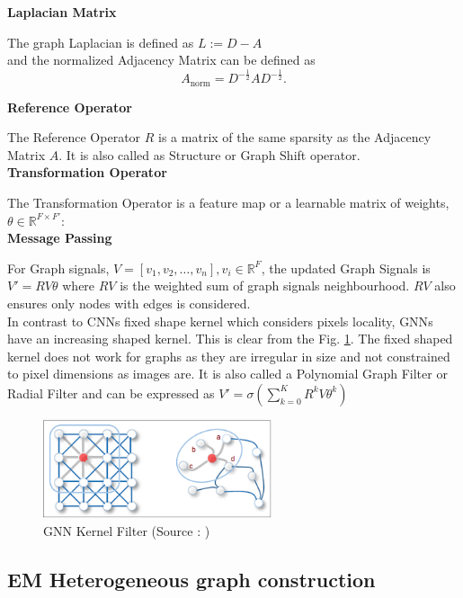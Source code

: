 \documentclass{report} %
\begin{document}
\textbf{Laplacian Matrix}

The graph Laplacian is defined as \( L := D - A \) \\ and the normalized Adjacency Matrix can be defined as
\[
A_{\text{norm}} = D^{-\frac{1}{2}} A D^{-\frac{1}{2}}.
\]

\textbf{Reference Operator}

The Reference Operator \( R \) is a matrix of the same sparsity as the Adjacency Matrix \( A \). It is also called as Structure or Graph Shift operator.\\

\textbf{Transformation Operator}

The Transformation Operator is a feature map or a learnable matrix of weights, \( \theta \in \mathbb{R}^{F \times F'} \):\\

\textbf{Message Passing}

For Graph signals, \( V = [v_1, v_2, \dots, v_n], v_i  \in \mathbb{R}^F \), the updated Graph Signals is \( V' = RV\theta \) 
where \( RV \) is the weighted sum of graph signals neighbourhood. \( RV \) also ensures only nodes with edges is considered.\\

In contrast to \ac{CNN}s fixed shape kernel which considers pixels locality, \ac{GNN}s have an increasing shaped kernel. This is clear from the Fig. \ref{fig:GNN Kernel Filter}. 
The fixed shaped kernel does not work for graphs  as they are irregular in size and not constrained to pixel dimensions as images are. 
It is also called a Polynomial Graph Filter or Radial Filter and can be expressed as $V' = \sigma (\sum_{k=0}^{K}R^{k}V\theta^{k})$ 

\begin{figure}[H]
    \centering
    \includegraphics[width=0.6\textwidth]{./ReportImages/GNNKernel.png} 
    \caption{\ac{GNN} Kernel Filter (Source : \cite{GNN-2019})}
    \label{fig:GNN Kernel Filter}
\end{figure}

\subsection{EM Heterogeneous graph construction}
\label{subsec:EM Heterogeneous graph construction}
\end{document}
